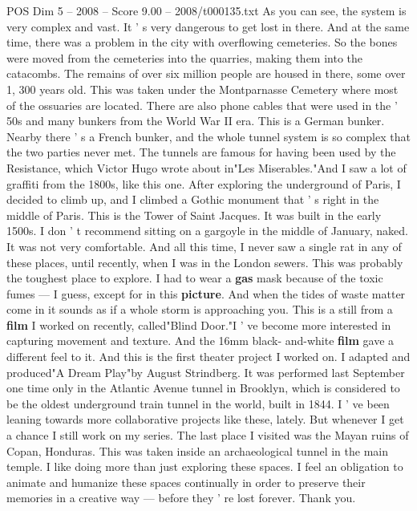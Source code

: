 \begin{textsample}{POS Dim 5 – 2008 – Score 9.00 – 2008/t000135.txt}
As you can see, the system is very complex and vast.
It ' s very dangerous to get lost in there.
And at the same time, there was a problem in the city with overflowing cemeteries.
So the bones were moved from the cemeteries into the quarries, making them into the catacombs.
The remains of over six million people are housed in there, some over 1, 300 years old.
This was taken under the Montparnasse Cemetery where most of the ossuaries are located.
There are also phone cables that were used in the ' 50s and many bunkers from the World War II era.
This is a German bunker.
Nearby there ' s a French bunker, and the whole tunnel system is so complex that the two parties never met.
The tunnels are famous for having been used by the Resistance, which Victor Hugo wrote about in"Les Miserables."And I saw a lot of graffiti from the 1800s, like this one.
After exploring the underground of Paris, I decided to climb up, and I climbed a Gothic monument that ' s right in the middle of Paris.
This is the Tower of Saint Jacques.
It was built in the early 1500s.
I don ' t recommend sitting on a gargoyle in the middle of January, naked.
It was not very comfortable.
And all this time, I never saw a single rat in any of these places, until recently, when I was in the London sewers.
This was probably the toughest place to explore.
I had to wear a \textbf{gas} mask because of the toxic fumes — I guess, except for in this \textbf{picture}.
And when the tides of waste matter come in it sounds as if a whole storm is approaching you.
This is a still from a \textbf{film} I worked on recently, called"Blind Door."I ' ve become more interested in capturing movement and texture.
And the 16mm black- and-white \textbf{film} gave a different feel to it.
And this is the first theater project I worked on.
I adapted and produced"A Dream Play"by August Strindberg.
It was performed last September one time only in the Atlantic Avenue tunnel in Brooklyn, which is considered to be the oldest underground train tunnel in the world, built in 1844.
I ' ve been leaning towards more collaborative projects like these, lately.
But whenever I get a chance I still work on my series.
The last place I visited was the Mayan ruins of Copan, Honduras.
This was taken inside an archaeological tunnel in the main temple.
I like doing more than just exploring these spaces.
I feel an obligation to animate and humanize these spaces continually in order to preserve their memories in a creative way — before they ' re lost forever.
Thank you.

\end{textsample}

